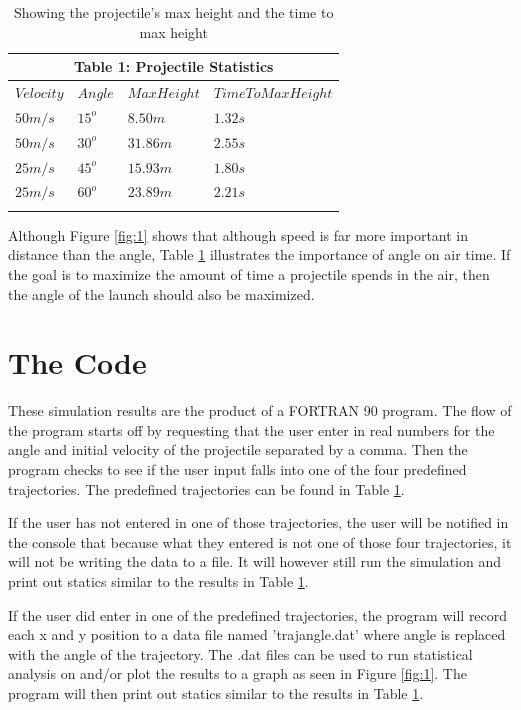 \documentclass{article}
\begin{document}
\begin{table}[H]
\centering
\begin{tabular}{ l l l l } 
\multicolumn{4}{c}{Table 1: Projectile Statistics}\\
\hline \hline
$Velocity$ & $Angle$ & $Max Height$ & $Time To Max Height$\\
 \hline
 $50 m/s$ & 		$15^o$ 		& 		$8.50m$ 	& 		$1.32s$\\\noalign{\smallskip}
 $50 m/s$ & 		$30^o$ 	& 		$31.86m$	& 		$2.55s$\\\noalign{\smallskip}
 $25 m/s$ & 		$45^o$ 	& 		$15.93m$ & 		$1.80s$\\\noalign{\smallskip}
 $25 m/s$ & 		$60^o$ 	& 		$23.89m$ & 	$2.21s$\\\noalign{\smallskip}
 \hline
\end{tabular}
\caption{Showing the projectile's max height and the time to max height}
\label{table:1}
\end{table}
\noindent
Although Figure \ref{fig:1} shows that although speed is far more important in distance than the angle, Table \ref{table:1} illustrates the importance of angle on air time. If the goal is to maximize the amount of time a projectile spends in the air, then the angle of the launch should also be maximized.

\section{The Code}
These simulation results are the product of a FORTRAN 90 program. The flow of the program starts off by requesting that the user enter in real numbers for the angle and initial velocity of the projectile separated by a comma. Then the program checks to see if the user input falls into one of the four predefined trajectories. The predefined trajectories can be found in Table \ref{table:1}. 

If the user has not entered in one of those trajectories, the user will be notified in the console that because what they entered is not one of those four trajectories, it will not be writing the data to a file. It will however still run the simulation and print out statics similar to the results in Table \ref{table:1}.

If the user did enter in one of the predefined trajectories, the program will record each x and y position to a data file named 'traj{angle}.dat' where {angle} is replaced with the angle of the trajectory. The .dat files can be used to run statistical analysis on and/or plot the results to a graph as seen in Figure \ref{fig:1}. The program will then print out statics similar to the results in Table \ref{table:1}.
\end{document}
